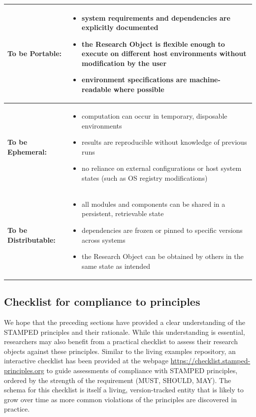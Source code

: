 \documentclass{article}
\makeatletter
\newcommand{\hyanchor}[1]{\texorpdfstring{\Hy@raisedlink{\hypertarget{#1}{}}}{}}
\newcommand{\anchoredsubsection}[2]{\subsection[#2]{\hyanchor{#1}#2}}
\makeatother
\begin{document}
\begin{table}[htbp]
\begin{tabular}{|l|p{}|}
\hline
\textbf{To be Portable:} &
\begin{itemize}[noitemsep,topsep=0pt,leftmargin=*]
  \item system requirements and dependencies are explicitly documented
  \item the Research Object is flexible enough to execute on different host environments without modification by the user
  \item environment specifications are machine-readable where possible
\end{itemize} \\
\hline
\textbf{To be Ephemeral:} &
\begin{itemize}[noitemsep,topsep=0pt,leftmargin=*]
  \item computation can occur in temporary, disposable environments
  \item results are reproducible without knowledge of previous runs
  \item no reliance on external configurations or host system states (such as OS registry modifications)
\end{itemize} \\
\hline
\textbf{To be Distributable:} &
\begin{itemize}[noitemsep,topsep=0pt,leftmargin=*]
  \item all modules and components can be shared in a persistent, retrievable state
  \item dependencies are frozen or pinned to specific versions across systems
  \item the Research Object can be obtained by others in the same state as intended
\end{itemize} \\
\hline
\end{tabular}
\label{tab:stamped-principles}
\end{table}





\anchoredsubsection{checklist}{Checklist for compliance to principles}

We hope that the preceding sections have provided a clear understanding of the STAMPED principles and their rationale.
While this understanding is essential, researchers may also benefit from a practical checklist to assess their research objects against these principles.
Similar to the living examples repository, an interactive checklist has been provided at the webpage \url{https://checklist.stamped-principles.org} to guide assessments of compliance with STAMPED principles, ordered by the strength of the requirement (MUST, SHOULD, MAY).
The schema for this checklist is itself a living, version-tracked entity \cite{stamped-checklist-schema:v0.1.0} that is likely to grow over time as more common violations of the principles are discovered in practice.
\end{document}
